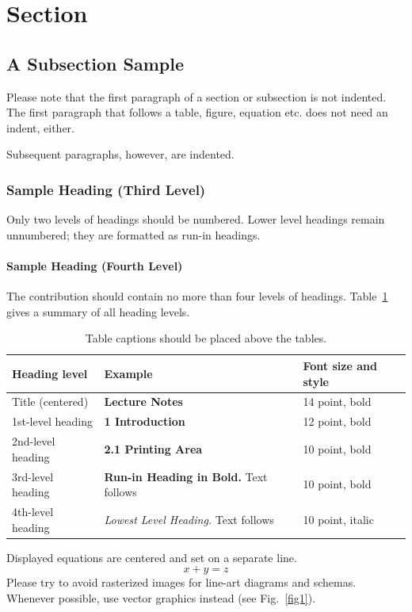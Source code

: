 \documentclass[runningheads]{llncs}
\begin{document}
\section{Section}
\subsection{A Subsection Sample}
Please note that the first paragraph of a section or subsection is
not indented. The first paragraph that follows a table, figure,
equation etc. does not need an indent, either.

Subsequent paragraphs, however, are indented.

\subsubsection{Sample Heading (Third Level)} Only two levels of
headings should be numbered. Lower level headings remain unnumbered;
they are formatted as run-in headings.

\paragraph{Sample Heading (Fourth Level)}
The contribution should contain no more than four levels of
headings. Table~\ref{tab1} gives a summary of all heading levels.

\begin{table}
\caption{Table captions should be placed above the
tables.}\label{tab1}
\begin{tabular}{|l|l|l|}
\hline
Heading level &  Example & Font size and style\\
\hline
Title (centered) &  {\Large\bfseries Lecture Notes} & 14 point, bold\\
1st-level heading &  {\large\bfseries 1 Introduction} & 12 point, bold\\
2nd-level heading & {\bfseries 2.1 Printing Area} & 10 point, bold\\
3rd-level heading & {\bfseries Run-in Heading in Bold.} Text follows & 10 point, bold\\
4th-level heading & {\itshape Lowest Level Heading.} Text follows & 10 point, italic\\
\hline
\end{tabular}
\end{table}


\noindent Displayed equations are centered and set on a separate
line.
\begin{equation}
x + y = z
\end{equation}
Please try to avoid rasterized images for line-art diagrams and
schemas. Whenever possible, use vector graphics instead (see
Fig.~\ref{fig1}).
\end{document}

